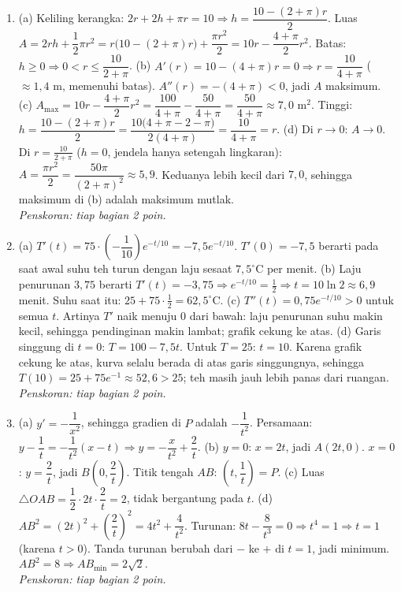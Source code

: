 \documentclass[a4paper,11pt]{article}
\begin{document}
\small\begin{enumerate}[leftmargin=2em,itemsep=3pt,topsep=2pt]
\item[\textbf{1.}] (a) Keliling kerangka: $2r+2h+\pi r=10\Rightarrow h=\dfrac{10-(2+\pi)r}{2}$. Luas $A=2rh+\dfrac12\pi r^2=r\big(10-(2+\pi)r\big)+\dfrac{\pi r^2}2=10r-\dfrac{4+\pi}2r^2$. Batas: $h\ge0\Rightarrow0<r\le\dfrac{10}{2+\pi}$. (b) $A'(r)=10-(4+\pi)r=0\Rightarrow r=\dfrac{10}{4+\pi}$ ($\approx1{,}4$ m, memenuhi batas). $A''(r)=-(4+\pi)<0$, jadi $A$ maksimum. (c) $A_{\max}=10r-\dfrac{4+\pi}2r^2=\dfrac{100}{4+\pi}-\dfrac{50}{4+\pi}=\dfrac{50}{4+\pi}\approx7{,}0$ m$^2$. Tinggi: $h=\dfrac{10-(2+\pi)r}2=\dfrac{10\big(4+\pi-2-\pi\big)}{2(4+\pi)}=\dfrac{10}{4+\pi}=r$. (d) Di $r\to0$: $A\to0$. Di $r=\frac{10}{2+\pi}$ ($h=0$, jendela hanya setengah lingkaran): $A=\dfrac{\pi r^2}2=\dfrac{50\pi}{(2+\pi)^2}\approx5{,}9$. Keduanya lebih kecil dari $7{,}0$, sehingga maksimum di (b) adalah maksimum mutlak. \\ \textit{Penskoran: tiap bagian 2 poin.}
\item[\textbf{2.}] (a) $T'(t)=75\cdot\left(-\dfrac1{10}\right)e^{-t/10}=-7{,}5e^{-t/10}$. $T'(0)=-7{,}5$ berarti pada saat awal suhu teh turun dengan laju sesaat $7{,}5^\circ$C per menit. (b) Laju penurunan $3{,}75$ berarti $T'(t)=-3{,}75\Rightarrow e^{-t/10}=\frac12\Rightarrow t=10\ln2\approx6{,}9$ menit. Suhu saat itu: $25+75\cdot\frac12=62{,}5^\circ$C. (c) $T''(t)=0{,}75e^{-t/10}>0$ untuk semua $t$. Artinya $T'$ naik menuju $0$ dari bawah: laju penurunan suhu makin kecil, sehingga pendinginan makin lambat; grafik cekung ke atas. (d) Garis singgung di $t=0$: $T=100-7{,}5t$. Untuk $T=25$: $t=10$. Karena grafik cekung ke atas, kurva selalu berada di atas garis singgungnya, sehingga $T(10)=25+75e^{-1}\approx52{,}6>25$; teh masih jauh lebih panas dari ruangan. \\ \textit{Penskoran: tiap bagian 2 poin.}
\item[\textbf{3.}] (a) $y'=-\dfrac1{x^2}$, sehingga gradien di $P$ adalah $-\dfrac1{t^2}$. Persamaan: $y-\dfrac1t=-\dfrac1{t^2}(x-t)\Rightarrow y=-\dfrac x{t^2}+\dfrac2t$. (b) $y=0$: $x=2t$, jadi $A(2t,0)$. $x=0$: $y=\dfrac2t$, jadi $B\!\left(0,\dfrac2t\right)$. Titik tengah $AB$: $\left(t,\dfrac1t\right)=P$. (c) Luas $\triangle OAB=\dfrac12\cdot2t\cdot\dfrac2t=2$, tidak bergantung pada $t$. (d) $AB^2=(2t)^2+\left(\dfrac2t\right)^2=4t^2+\dfrac4{t^2}$. Turunan: $8t-\dfrac8{t^3}=0\Rightarrow t^4=1\Rightarrow t=1$ (karena $t>0$). Tanda turunan berubah dari $-$ ke $+$ di $t=1$, jadi minimum. $AB^2=8\Rightarrow AB_{\min}=2\sqrt2$. \\ \textit{Penskoran: tiap bagian 2 poin.}

\end{enumerate}
\end{document}
